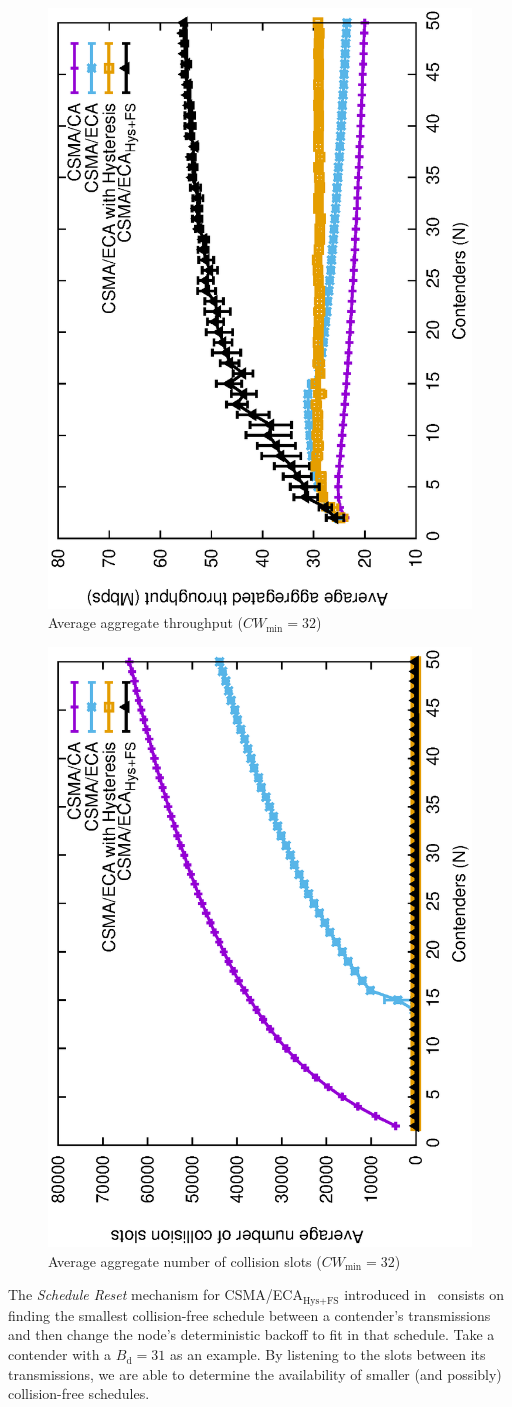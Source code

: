 	\begin{figure}[t!]
	\centering
		\includegraphics[width=0.5\linewidth, angle=-90]{figures/throughput-perfectChannel.eps}
		\caption{Average aggregate throughput ($CW_{\min}=32$)\cite{sanabria2014high}}
		\label{fig:CAvsECA}
	\end{figure}
	
	\begin{figure}[t!]
	\centering
		\includegraphics[width=0.5\linewidth, angle=-90]{figures/collisions-perfectChannel.eps}
		\caption{Average aggregate number of collision slots ($CW_{\min}=32$)\cite{sanabria2014high}}
		\label{fig:col-CAvsECA}
	\end{figure}


The \emph{Schedule Reset} mechanism for CSMA/ECA$_{\text{Hys+FS}}$ introduced in~\cite{sanabria2014high} consists on finding the smallest collision-free schedule between a contender's transmissions and then change the node's deterministic backoff to fit in that schedule. Take a contender with a $B_{\text{d}}=31$ as an example. By listening to the slots between its transmissions, we are able to determine the availability of smaller (and possibly) collision-free schedules. 


